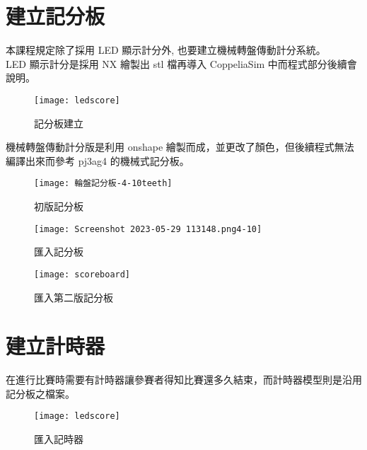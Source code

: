 \section{建立記分板}
本課程規定除了採用 LED 顯示計分外, 也要建立機械轉盤傳動計分系統。\\
LED 顯示計分是採用 NX 繪製出 stl 檔再導入 CoppeliaSim 中而程式部分後續會說明。\\
\begin{figure}[hbt!]
\begin{center}
\texttt{[image: ledscore]}
\caption{\Large 記分板建立}\label{記分板建立}
\end{center}
\end{figure}
機械轉盤傳動計分版是利用 onshape 繪製而成，並更改了顏色，但後續程式無法編譯出來而參考 pj3ag4 的機械式記分板。
\begin{figure}[hbt!]
\begin{center}
\texttt{[image: 輪盤記分板-4-10teeth]}
\caption{\Large 初版記分板}\label{初版記分板}
\end{center}
\end{figure}
\begin{figure}[hbt!]
\begin{center}
\texttt{[image: Screenshot 2023-05-29 113148.png4-10]}
\caption{\Large 匯入記分板}\label{匯入記分板}
\end{center}
\end{figure}
\begin{figure}[hbt!]
\begin{center}
\texttt{[image: scoreboard]}
\caption{\Large 匯入第二版記分板}\label{匯入第二版記分板}
\end{center}
\end{figure}
\newpage

\section{建立計時器}
在進行比賽時需要有計時器讓參賽者得知比賽還多久結束，而計時器模型則是沿用記分板之檔案。\\
\begin{figure}[hbt!]
\begin{center}
\texttt{[image: ledscore]}
\caption{\Large 匯入記時器}\label{匯入記時器}
\end{center}
\end{figure}
\newpage

